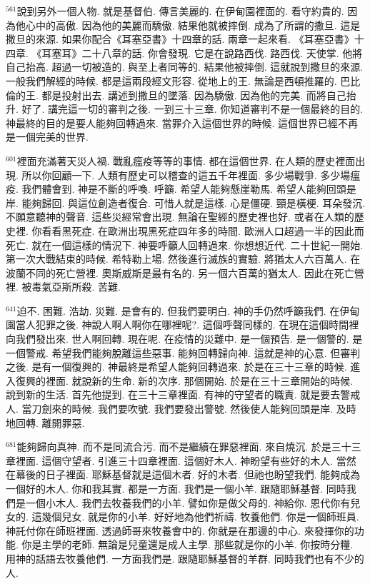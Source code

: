 \documentclass{book}
\begin{document}
$^{561}$說到另外一個人物.
就是基督伯.
傳言美麗的.
在伊甸園裡面的.
看守約貴的.
因為他心中的高傲.
因為他的美麗而驕傲.
結果他就被摔倒.
成為了所謂的撒旦.
這是撒旦的來源.
如果你配合《耳塞亞書》十四章的話.
兩章一起來看.
《耳塞亞書》十四章.
《耳塞耳》二十八章的話.
你會發現.
它是在說路西伐.
路西伐.
天使掌.
他將自己抬高.
超過一切被造的.
與至上者同等的.
結果他被摔倒.
這就說到撒旦的來源.
一般我們解經的時候.
都是這兩段經文形容.
從地上的王.
無論是西頓推羅的.
巴比倫的王.
都是投射出去.
講述到撒旦的墜落.
因為驕傲.
因為他的完美.
而將自己抬升.
好了.
講完這一切的審判之後.
一到三十三章.
你知道審判不是一個最終的目的.
神最終的目的是要人能夠回轉過來.
當罪介入這個世界的時候.
這個世界已經不再是一個完美的世界.

$^{601}$裡面充滿著天災人禍.
戰亂瘟疫等等的事情.
都在這個世界.
在人類的歷史裡面出現.
所以你回顧一下.
人類有歷史可以稽查的這五千年裡面.
多少場戰爭.
多少場瘟疫.
我們體會到.
神是不斷的呼喚.
呼籲.
希望人能夠懸崖勒馬.
希望人能夠回頭是岸.
能夠歸回.
與這位創造者復合.
可惜人就是這樣.
心是僵硬.
頸是橫梗.
耳朵發沉.
不願意聽神的聲音.
這些災經常會出現.
無論在聖經的歷史裡也好.
或者在人類的歷史裡.
你看看黑死症.
在歐洲出現黑死症四年多的時間.
歐洲人口超過一半的因此而死亡.
就在一個這樣的情況下.
神要呼籲人回轉過來.
你想想近代.
二十世紀一開始.
第一次大戰結束的時候.
希特勒上場.
然後進行滅族的實驗.
將猶太人六百萬人.
在波蘭不同的死亡營裡.
奧斯威斯是最有名的.
另一個六百萬的猶太人.
因此在死亡營裡.
被毒氣亞斯所殺.
苦難.

$^{641}$迫不.
困難.
浩劫.
災難.
是會有的.
但我們要明白.
神的手仍然呼籲我們.
在伊甸園當人犯罪之後.
神說人啊人啊你在哪裡呢?.
這個呼聲同樣的.
在現在這個時間裡向我們發出來.
世人啊回轉.
現在呢.
在疫情的災難中.
是一個預告.
是一個警的.
是一個警戒.
希望我們能夠脫離這些惡事.
能夠回轉歸向神.
這就是神的心意.
但審判之後.
是有一個復興的.
神最終是希望人能夠回轉過來.
於是在三十三章的時候.
進入復興的裡面.
就說新的生命.
新的次序.
那個開始.
於是在三十三章開始的時候.
說到新的生活.
首先他提到.
在三十三章裡面.
有神的守望者的職責.
就是要去警戒人.
當刀劍來的時候.
我們要吹號.
我們要發出警號.
然後使人能夠回頭是岸.
及時地回轉.
離開罪惡.

$^{681}$能夠歸向真神.
而不是同流合污.
而不是繼續在罪惡裡面.
來自燒沉.
於是三十三章裡面.
這個守望者.
引進三十四章裡面.
這個好木人.
神盼望有些好的木人.
當然在幕後的日子裡面.
耶穌基督就是這個木者.
好的木者.
但祂也盼望我們.
能夠成為一個好的木人.
你和我其實.
都是一方面.
我們是一個小羊.
跟隨耶穌基督.
同時我們是一個小木人.
我們去牧養我們的小羊.
譬如你是做父母的.
神給你.
恩代你有兒女的.
這幾個兒女.
就是你的小羊.
好好地為他們祈禱.
牧養他們.
你是一個師班員.
神託付你在師班裡面.
透過師哥來牧養會中的.
你就是在那邊的中心.
來發揮你的功能.
你是主學的老師.
無論是兒童還是成人主學.
那些就是你的小羊.
你按時分糧.
用神的話語去牧養他們.
一方面我們是.
跟隨耶穌基督的羊群.
同時我們也有不少的人.
\end{document}
